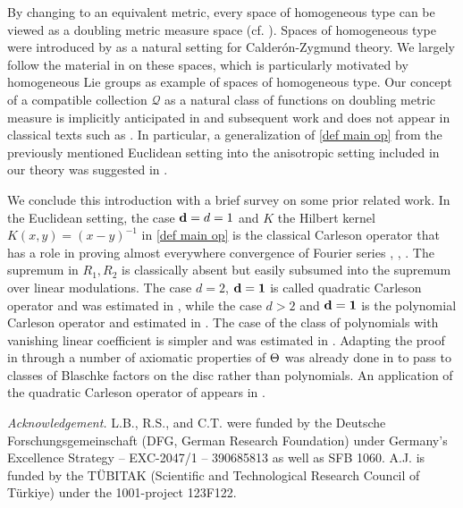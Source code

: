 By changing to an equivalent metric, every space of homogeneous type can be viewed as a doubling metric measure space (cf. \cite{MaciasSegovia}). Spaces of homogeneous type were introduced
by \cite{MR0499948} as a natural setting for Calder\'on-Zygmund theory. We largely follow the material in \cite{stein-book} on these spaces,
which is  particularly motivated by
homogeneous Lie groups as example of spaces of homogeneous type.
Our concept of a compatible collection $\mathcal{Q}$ as a natural class
of functions on doubling metric measure is implicitly anticipated in \cite{zk-polynomial} and subsequent
work \cite{mnatsakanyan} and does not appear in classical texts such as \cite{stein-book}. In particular, a generalization of \eqref{def main op} from the previously mentioned Euclidean setting into the anisotropic setting included in our theory was suggested in \cite{zk-polynomial}.



We conclude this introduction with a brief survey on some prior related work. In the Euclidean setting, the case  ${\bf d}=d=1$ and $K$ the Hilbert kernel
$K(x,y)=(x-y)^{-1}$ in \eqref{def main op} is the classical
Carleson operator that has a role in proving
almost everywhere convergence of Fourier series
\cite{carleson}, \cite{fefferman}, \cite{lacey-thiele}.
The supremum in $R_1,R_2$ is classically absent but easily subsumed into the supremum over linear modulations.
The case $d=2$, ${\bf{d}=1}$ is called quadratic Carleson operator and
was estimated in \cite{lie-quadratic}, while the case $d>2$ and
${\bf{d}=1}$ is the polynomial Carleson operator and estimated in  \cite{lie-polynomial}. The case of the class of polynomials with
vanishing linear coefficient is simpler and was estimated in \cite{stein-wainger}.
Adapting the proof in \cite{zk-polynomial} through
a number of axiomatic properties of $\Theta$ was already done
in  \cite{mnatsakanyan} to pass to classes of Blaschke factors on the disc rather than polynomials. An application of the quadratic Carleson
operator of \cite{lie-quadratic} appears in \cite{ramos}. 

\noindent \textit{Acknowledgement.}
L.B., R.S., and C.T. were funded by the Deutsche Forschungsgemeinschaft (DFG, German Research Foundation) under Germany's Excellence Strategy -- EXC-2047/1 -- 390685813 as well as SFB 1060.
A.J. is funded by the T\"UBITAK (Scientific and Technological Research Council of T\"urkiye) under the 1001-project 123F122.

